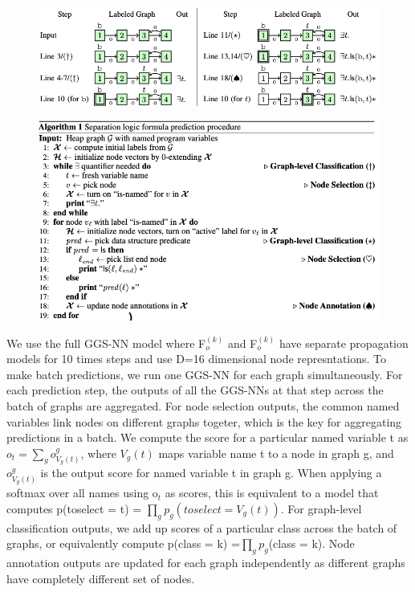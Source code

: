 \documentclass{article}
\begin{document}
\begin{figure}[ht]
\vskip 0.2in
\begin{center}
\centerline{\includegraphics[width=\columnwidth]{Images/Bug1-3.png}}
\label{icml-historical}
\end{center}
\vskip -0.2in
\end{figure}

\begin{figure}[ht]
\vskip 0.2in
\begin{center}
\centerline{\includegraphics[width=\columnwidth]{Images/Bug1-4.png}}
\label{icml-historical}
\end{center}
\vskip -0.2in
\end{figure}

We use the full GGS-NN model where F$_o^{(k)}$ and F$_o^{(k)}$ have separate propagation models for 10 times steps and use D=16 dimensional node represntations. To make batch predictions, we run one GGS-NN for each graph simultaneously. For each prediction step, the outputs of all the GGS-NNs at that step across the batch of graphs are aggregated. For node selection outputs, the common named variables link nodes on different graphs togeter, which is the key for aggregating predictions in a batch. We compute the score for a particular named variable t as $o_t = \sum_g o_{V_g(t)}^g$, where $V_g(t)$ maps variable name t to a node in graph g, and $o_{V_g(t)}^g$ is the output score for named variable t in graph g. When applying a softmax over all names using o$_t$ as scores, this is equivalent to a model that computes p(toselect = t) = $\prod _g p_g(toselect = V_g(t))$. For graph-level classification outputs, we add up scores of a particular class across the batch of graphs, or equivalently compute p(class = k) =$\prod _g p_g$(class = k). Node annotation outputs are updated for each graph independently as different graphs have completely different set of nodes.
\end{document}
